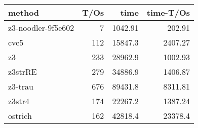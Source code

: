 \begin{tabular}{lrrr}
\hline
 method             &   T/Os &     time &   time-T/Os \\
\hline
 z3-noodler-9f5e602 &      7 &  1042.91 &      202.91 \\
 cvc5               &    112 & 15847.3  &     2407.27 \\
 z3                 &    233 & 28962.9  &     1002.93 \\
 z3strRE            &    279 & 34886.9  &     1406.87 \\
 z3-trau            &    676 & 89431.8  &     8311.81 \\
 z3str4             &    174 & 22267.2  &     1387.24 \\
 ostrich            &    162 & 42818.4  &    23378.4  \\
\hline
\end{tabular}
